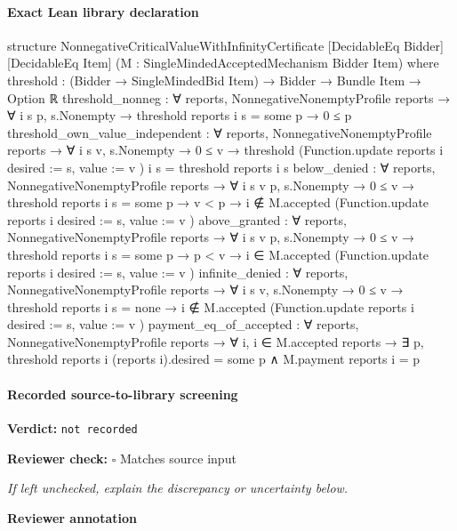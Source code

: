 \documentclass[10pt]{article}
\newcommand{\reviewerbox}{%
  \par\noindent\fbox{\parbox{0.96\linewidth}{\rule{0pt}{0.38in}}}\par
}
\newcommand{\reviewmatch}[1]{%
  \par\noindent\textbf{Reviewer check:} $\square$\; #1\par
  \noindent\emph{If left unchecked, explain the discrepancy or uncertainty below.}\par
}
\begin{document}
\paragraph{Exact Lean library declaration}
\begin{ReviewVerbatim}
structure NonnegativeCriticalValueWithInfinityCertificate
    [DecidableEq Bidder] [DecidableEq Item]
    (M : SingleMindedAcceptedMechanism Bidder Item) where
  threshold : (Bidder → SingleMindedBid Item) → Bidder → Bundle Item → Option ℝ
  threshold_nonneg :
    ∀ reports,
      NonnegativeNonemptyProfile reports →
        ∀ i s p, s.Nonempty → threshold reports i s = some p → 0 ≤ p
  threshold_own_value_independent :
    ∀ reports,
      NonnegativeNonemptyProfile reports →
        ∀ i s v,
          s.Nonempty →
            0 ≤ v →
              threshold
                  (Function.update reports i { desired := s, value := v }) i s =
                threshold reports i s
  below_denied :
    ∀ reports,
      NonnegativeNonemptyProfile reports →
        ∀ i s v p,
          s.Nonempty →
            0 ≤ v →
              threshold reports i s = some p →
                v < p →
                  i ∉ M.accepted
                    (Function.update reports i { desired := s, value := v })
  above_granted :
    ∀ reports,
      NonnegativeNonemptyProfile reports →
        ∀ i s v p,
          s.Nonempty →
            0 ≤ v →
              threshold reports i s = some p →
                p < v →
                  i ∈ M.accepted
                    (Function.update reports i { desired := s, value := v })
  infinite_denied :
    ∀ reports,
      NonnegativeNonemptyProfile reports →
        ∀ i s v,
          s.Nonempty →
            0 ≤ v →
              threshold reports i s = none →
                i ∉ M.accepted
                  (Function.update reports i { desired := s, value := v })
  payment_eq_of_accepted :
    ∀ reports,
      NonnegativeNonemptyProfile reports →
        ∀ i,
          i ∈ M.accepted reports →
            ∃ p,
              threshold reports i (reports i).desired = some p ∧
                M.payment reports i = p
\end{ReviewVerbatim}

\paragraph{Recorded source-to-library screening}
\textbf{Verdict:} \texttt{not recorded}
\reviewmatch{Matches source input}
\noindent\textbf{Reviewer annotation}\par
\reviewerbox
\clearpage
\hypertarget{library-prerequisite-5ec991f2a5a9cb54}{}
\end{document}
